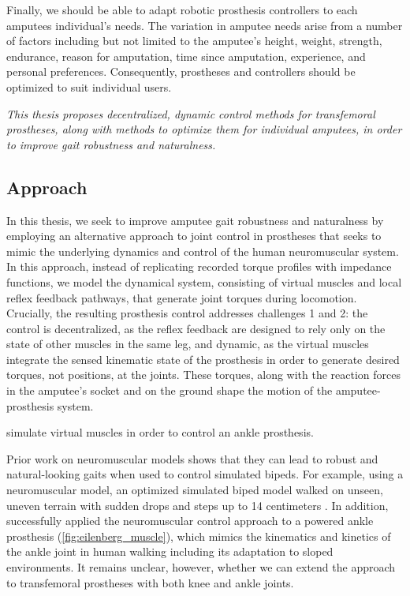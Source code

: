 Finally, we should be able to adapt robotic prosthesis controllers to each
amputees individual's needs. The variation in amputee needs arise from a number
of factors including but not limited to the amputee's height, weight, strength,
endurance, reason for amputation, time since amputation, experience, and
personal preferences. Consequently, prostheses and controllers should be
optimized to suit individual users.

\vspace{2ex}
\begin{fullwidth} \emph{This thesis proposes decentralized, dynamic control
methods for transfemoral prostheses, along with methods to optimize them for
individual amputees, in order to improve gait robustness and naturalness.}
\end{fullwidth}

\subsection{Approach}\label{sec:intro_approach}

In this thesis, we seek to improve amputee gait robustness and naturalness by
employing an alternative approach to joint control in prostheses that seeks to
mimic the underlying dynamics and control of the human neuromuscular system. In
this approach, instead of replicating recorded torque profiles with impedance
functions, we model the dynamical system, consisting of virtual muscles and
local reflex feedback pathways, that generate joint torques during locomotion.
Crucially, the resulting prosthesis control addresses challenges 1 and 2: the
control is decentralized, as the reflex feedback are designed to rely only on
the state of other muscles in the same leg, and dynamic, as the virtual muscles
integrate the sensed kinematic state of the prosthesis in order to generate
desired torques, not positions, at the joints. These torques, along with the
reaction forces in the amputee's socket and on the ground shape the motion of
the amputee-prosthesis system.
\begin{marginfigure}
    \centering
    \caption{\citet{eilenberg2010control} simulate virtual muscles in
    order to control an ankle prosthesis.}
    \label{fig:eilenberg_muscle}
\end{marginfigure}

Prior work on neuromuscular models shows that they can lead to robust and
natural-looking gaits when used to control simulated bipeds. For example, using
a neuromuscular model, an optimized simulated biped model walked on unseen,
uneven terrain with sudden drops and steps up to 14 centimeters
\citep{song2015neural}. In addition, \citet{eilenberg2010control} successfully
applied the neuromuscular control approach to a powered ankle prosthesis
(\cref{fig:eilenberg_muscle}), which mimics the kinematics and kinetics of the
ankle joint in human walking including its adaptation to sloped environments. It
remains unclear, however, whether we can extend the approach to transfemoral
prostheses with both knee and ankle joints.

